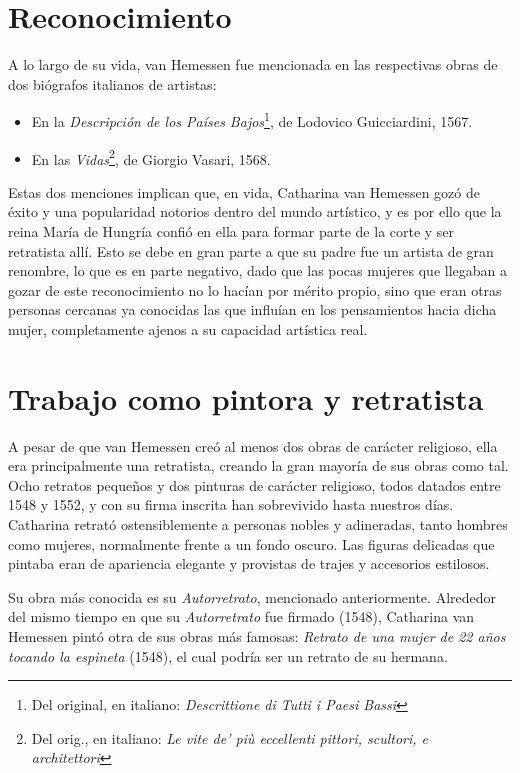 \documentclass[12pt]{book}
\begin{document}
\section{Reconocimiento}

A lo largo de su vida, van Hemessen fue mencionada en las respectivas obras de dos biógrafos italianos de artistas:
\begin{itemize}
	\item En la \textit{Descripción de los Países Bajos}\footnote{Del original, en italiano: \textit{Descrittione di Tutti i Paesi Bassi}}, de Lodovico Guicciardini, 1567.
	\item En las \textit{Vidas}\footnote{Del orig., en italiano: \textit{Le vite de' più eccellenti pittori, scultori, e architettori}}, de Giorgio Vasari, 1568.
\end{itemize}

Estas dos menciones implican que, en vida, Catharina van Hemessen gozó de éxito y una popularidad notorios dentro del mundo artístico, y es por ello que la reina María de Hungría confió en ella para formar parte de la corte y ser retratista allí. Esto se debe en gran parte a que su padre fue un artista de gran renombre, lo que es en parte negativo, dado que las pocas mujeres que llegaban a gozar de este reconocimiento no lo hacían por mérito propio, sino que eran otras personas cercanas ya conocidas las que influían en los pensamientos hacia dicha mujer, completamente ajenos a su capacidad artística real.

\section{Trabajo como pintora y retratista}

A pesar de que van Hemessen creó al menos dos obras de carácter religioso, ella era principalmente una retratista, creando la gran mayoría de sus obras como tal. Ocho retratos pequeños y dos pinturas de carácter religioso, todos datados entre 1548 y 1552, y con su firma inscrita han sobrevivido hasta nuestros días. Catharina retrató ostensiblemente a personas nobles y adineradas, tanto hombres como mujeres, normalmente frente a un fondo oscuro. Las figuras delicadas que pintaba eran de apariencia elegante y provistas de trajes y accesorios estilosos.\bigskip

Su obra más conocida es su \textit{Autorretrato}, mencionado anteriormente. Alrededor del mismo tiempo en que su \textit{Autorretrato} fue firmado (1548), Catharina van Hemessen pintó otra de sus obras más famosas: \textit{Retrato de una mujer de 22 años tocando la espineta} (1548), el cual podría ser un retrato de su hermana.\bigskip
\end{document}
